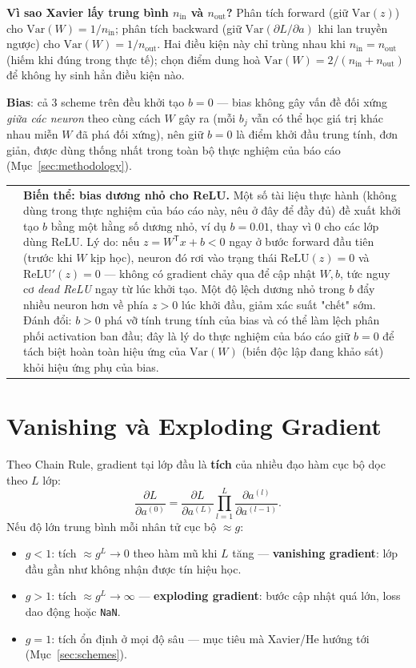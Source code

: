 \documentclass[12pt,a4paper]{report}
\makeatletter
\newenvironment{tructiep}[1][Cách hiểu đơn giản]
  {\par\smallskip\noindent\begin{tabular}{@{}p{0.35em}@{\hspace{6pt}}p{\dimexpr\linewidth-1.9em\relax}@{}}
   \textcolor{boxln}{\rule{2pt}{\baselineskip}} & \textbf{#1.}\enspace\ignorespaces}
  {\end{tabular}\par\smallskip}
\newcommand{\T}{^{\mathsf{T}}}
\makeatother
\begin{document}
\textbf{Vì sao Xavier lấy trung bình $n_{\text{in}}$ và $n_{\text{out}}$?}
Phân tích forward (giữ $\mathrm{Var}(z)$) cho $\mathrm{Var}(W)=1/n_{\text{in}}$;
phân tích backward (giữ $\mathrm{Var}(\partial L/\partial a)$ khi lan
truyền ngược) cho $\mathrm{Var}(W)=1/n_{\text{out}}$. Hai điều kiện này chỉ
trùng nhau khi $n_{\text{in}}=n_{\text{out}}$ (hiếm khi đúng trong thực
tế); \citet{glorot2010understanding} chọn điểm dung hoà
$\mathrm{Var}(W)=2/(n_{\text{in}}+n_{\text{out}})$ để không hy sinh hẳn
điều kiện nào.

\textbf{Bias}: cả 3 scheme trên đều khởi tạo $b=0$ --- bias không gây vấn
đề đối xứng \emph{giữa các neuron} theo cùng cách $W$ gây ra (mỗi $b_j$
vẫn có thể học giá trị khác nhau miễn $W$ đã phá đối xứng), nên giữ $b=0$
là điểm khởi đầu trung tính, đơn giản, được dùng thống nhất trong toàn bộ
thực nghiệm của báo cáo (Mục~\ref{sec:methodology}).

\begin{tructiep}[Biến thể: bias dương nhỏ cho ReLU]
Một số tài liệu thực hành (không dùng trong thực nghiệm của báo cáo này,
nêu ở đây để đầy đủ) đề xuất khởi tạo $b$ bằng một hằng số dương nhỏ, ví
dụ $b=0.01$, thay vì $0$ cho các lớp dùng ReLU. Lý do: nếu $z=W\T x+b<0$
ngay ở bước forward đầu tiên (trước khi $W$ kịp học), neuron đó rơi vào
trạng thái $\mathrm{ReLU}(z)=0$ và $\mathrm{ReLU}'(z)=0$ --- không có
gradient chảy qua để cập nhật $W,b$, tức nguy cơ \emph{dead ReLU} ngay từ
lúc khởi tạo. Một độ lệch dương nhỏ trong $b$ đẩy nhiều neuron hơn về phía
$z>0$ lúc khởi đầu, giảm xác suất "chết" sớm. Đánh đổi: $b>0$ phá vỡ tính
trung tính của bias và có thể làm lệch phân phối activation ban đầu; đây
là lý do thực nghiệm của báo cáo giữ $b=0$ để tách biệt hoàn toàn hiệu ứng
của $\mathrm{Var}(W)$ (biến độc lập đang khảo sát) khỏi hiệu ứng phụ của
bias.
\end{tructiep}

\section{Vanishing và Exploding Gradient}
\label{sec:vanishing}

Theo Chain Rule, gradient tại lớp đầu là \textbf{tích} của nhiều đạo hàm
cục bộ dọc theo $L$ lớp:
$$\frac{\partial L}{\partial a^{(0)}} = \frac{\partial L}{\partial a^{(L)}}\prod_{l=1}^{L} \frac{\partial a^{(l)}}{\partial a^{(l-1)}}.$$
Nếu độ lớn trung bình mỗi nhân tử cục bộ $\approx g$:
\begin{itemize}
\item $g<1$: tích $\approx g^L \to 0$ theo hàm mũ khi $L$ tăng ---
  \textbf{vanishing gradient}: lớp đầu gần như không nhận được tín hiệu
  học.
\item $g>1$: tích $\approx g^L \to \infty$ --- \textbf{exploding
  gradient}: bước cập nhật quá lớn, loss dao động hoặc \texttt{NaN}.
\item $g=1$: tích ổn định ở mọi độ sâu --- mục tiêu mà Xavier/He hướng
  tới (Mục~\ref{sec:schemes}).
\end{itemize}
\end{document}
